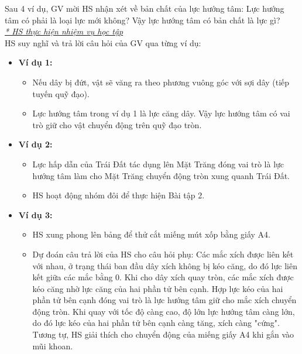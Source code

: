 {			Sau 4 ví dụ, GV mời HS nhận xét về bản chất của lực hướng tâm: Lực hướng tâm có phải là loại lực mới không? Vậy lực hướng tâm có bản chất là lực gì?\\
\textit{\underline{* HS thực hiện nhiệm vụ học tập}}\\
HS suy nghĩ và trả lời câu hỏi của GV qua từng ví dụ:
\begin{itemize}
	\item \textbf{Ví dụ 1:}
	\begin{itemize}
		\item Nếu dây bị đứt, vật sẽ văng ra theo phương vuông góc với sợi dây (tiếp tuyến quỹ đạo).
		\item Lực hướng tâm trong ví dụ 1 là lực căng dây. Vậy lực hướng tâm có vai trò giữ cho vật chuyển động trên quỹ đạo tròn.
	\end{itemize}
	\item \textbf{Ví dụ 2:}
	\begin{itemize}
		\item Lực hấp dẫn của Trái Đất tác dụng lên Mặt Trăng đóng vai trò là lực hướng tâm làm cho Mặt Trăng chuyển động tròn xung quanh Trái Đất.
		\item HS hoạt động nhóm đôi để thực hiện Bài tập 2.
	\end{itemize}
	\item \textbf{Ví dụ 3:} 
	\begin{itemize}
		\item HS xung phong lên bảng để thử cắt miếng mút xốp bằng giấy A4.
		\item Dự đoán câu trả lời của HS cho câu hỏi phụ: Các mắc xích được liên kết với nhau, ở trạng thái ban đầu dây xích không bị kéo căng, do đó lực liên kết giữa các mắc bằng 0. Khi cho dây xích quay tròn, các mắc xích được kéo căng nhờ lực căng của hai phần tử bên cạnh. Hợp lực kéo của hai phần tử bên cạnh đóng vai trò là lực hướng tâm giữ cho mắc xích chuyển động tròn. Khi quay với tốc độ càng cao, độ lớn lực hướng tâm càng lớn, do đó lực kéo của hai phần tử bên cạnh càng tăng, xích càng "cứng".\\
		Tương tự, HS giải thích cho chuyển động của miếng giấy A4 khi gắn vào mũi khoan.
		\begin{center}

\end{center}
\end{itemize}
\end{itemize}}

